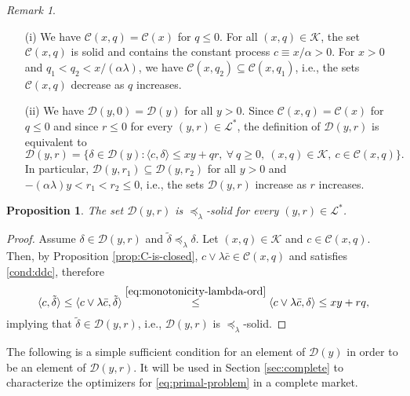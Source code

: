 \documentclass[11pt, oneside]{article}   	%
\theoremstyle{plain}
\newtheorem{prop}[thm]{Proposition}
\theoremstyle{definition}
\theoremstyle{remark}
\newtheorem{rem}[thm]{Remark}
\begin{document}
\begin{rem}
\begin{enumerate}
\item[(i)] We have $\mathcal{C}(x,q)=\mathcal{C}(x)$ for $q\leq 0$. For all $(x,q)\in\mathcal{K}$, the set $\mathcal{C}(x,q)$ is solid and contains the constant process $c\equiv x/\alpha>0$. For $x>0$ and $q_1<q_2<x/(\alpha\lambda)$, we have $\mathcal{C}(x,q_2)\subseteq\mathcal{C}(x,q_1)$, i.e., the sets $\mathcal{C}(x,q)$ decrease as $q$ increases.
\item[(ii)] We have $\mathcal{D}(y,0)=\mathcal{D}(y)$ for all $y>0$.
Since $\mathcal{C}(x,q)=\mathcal{C}(x)$ for $q\leq 0$ and since $r\leq0$ for every $(y,r)\in\mathcal{L}^*$, the definition of $\mathcal{D}(y,r)$ is equivalent to
\begin{equation}\label{eq:def-d-spaces}
\mathcal{D}(y,r)=\{\delta\in\mathcal{D}(y):\langle c,\delta \rangle\leq xy+qr,\ \forall\ q\geq 0, \ (x,q)\in\mathcal{K}, \ c\in\mathcal{C}(x,q)\}.
\end{equation}
In particular, $\mathcal{D}(y,r_1)\subseteq\mathcal{D}(y,r_2)$ for all $y>0$ and $-(\alpha\lambda) y<r_1<r_2\leq 0$, i.e., the sets $\mathcal{D}(y,r)$ increase as $r$ increases.
\end{enumerate}
\end{rem}
\begin{prop}\label{prop:D-y-r-solid}
The set $\mathcal{D}(y,r)$ is $\preceq_\lambda$-solid for every $(y,r)\in\mathcal{L}^*$.
\end{prop}
\begin{proof}
Assume $\delta\in\mathcal{D}(y,r)$ and $\tilde\delta\preceq_\lambda\delta$. Let $(x,q)\in\mathcal{K}$ and $c\in\mathcal{C}(x,q)$. Then, by Proposition \ref{prop:C-is-closed}, $c\vee\lambda\bar{c}\in\mathcal{C}(x,q)$ and satisfies \eqref{cond:ddc}, therefore
$$\langle c,\tilde{\delta}\rangle\leq\langle c\vee\lambda\bar{c},\tilde{\delta}\rangle\overset{\eqref{eq:monotonicity-lambda-ord}}{\leq}\langle c\vee\lambda\bar{c},\delta \rangle\leq xy+rq,$$
implying that $\tilde\delta\in\mathcal{D}(y,r)$, i.e., $\mathcal{D}(y,r)$ is $\preceq_\lambda$-solid.
\end{proof}

The following is a simple sufficient condition for an element of $\mathcal{D}(y)$ in order to be an element of $\mathcal{D}(y,r)$. It will be used in Section \ref{sec:complete} to characterize the optimizers for \eqref{eq:primal-problem} in a complete market.
\end{document}
